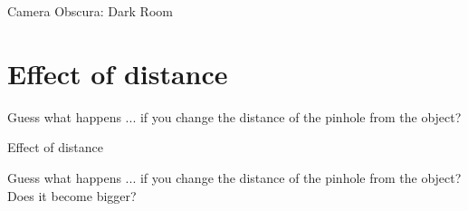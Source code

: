 \begin{frame}{Camera Obscura: Dark Room}
\end{frame}


\section{Effect of distance}
\begin{frame}{Guess what happens}
  ... if you change the distance of the pinhole from the object?
\end{frame}

\begin{frame}[fragile]{Effect of distance}
  
\end{frame}

\begin{frame}{Guess what happens}
  ... if you change the distance of the pinhole from the object?\\
  \pause
  {\color{red} Does it become bigger?}
\end{frame}

